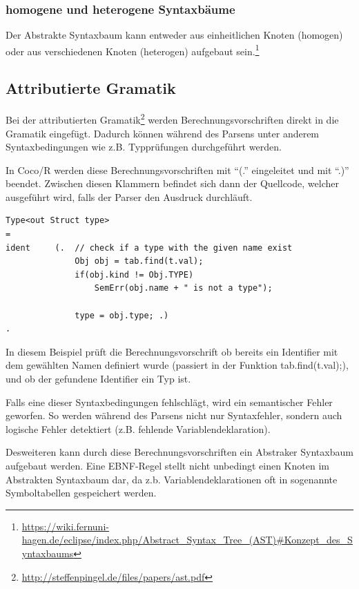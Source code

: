 \subsubsection{homogene und heterogene Syntaxbäume}

Der Abstrakte Syntaxbaum kann entweder aus einheitlichen Knoten (homogen) oder aus verschiedenen Knoten (heterogen) aufgebaut sein.\footnote{\url{https://wiki.fernuni-hagen.de/eclipse/index.php/Abstract_Syntax_Tree_(AST)\#Konzept_des_Syntaxbaums}}

\subsection{Attributierte Gramatik}

Bei der attributierten Gramatik\footnote{\url{http://steffenpingel.de/files/papers/ast.pdf}} werden Berechnungsvorschriften direkt in die Gramatik eingef\"ugt. Dadurch k\"onnen w\"ahrend des Parsens unter anderem Syntaxbedingungen wie z.B. Typpr\"ufungen durchgef\"uhrt werden.

In Coco/R werden diese Berechnungsvorschriften mit ``(.'' eingeleitet und mit ``.)'' beendet. Zwischen diesen Klammern befindet sich dann der Quellcode, welcher ausgef\"uhrt wird, falls der Parser den Ausdruck durchl\"auft.


\begin{lstlisting}[language=EBNF]
Type<out Struct type>
= 
ident     (.  // check if a type with the given name exist
              Obj obj = tab.find(t.val);
              if(obj.kind != Obj.TYPE)
                  SemErr(obj.name + " is not a type");

              type = obj.type; .)
. 
\end{lstlisting}

In diesem Beispiel pr\"uft die Berechnungsvorschrift ob bereits ein Identifier mit dem gew\"ahlten Namen definiert wurde (passiert in der Funktion tab.find(t.val);), und ob der gefundene Identifier ein Typ ist. 

Falls eine dieser Syntaxbedingungen fehlschl\"agt, wird ein semantischer Fehler geworfen. So werden w\"ahrend des Parsens nicht nur Syntaxfehler, sondern auch logische Fehler detektiert (z.B. fehlende Variablendeklaration).

Desweiteren kann durch diese Berechnungsvorschriften ein Abstraker Syntaxbaum aufgebaut werden. Eine EBNF-Regel stellt nicht unbedingt einen Knoten im Abstrakten Syntaxbaum dar, da z.b. Variablendeklarationen oft in sogenannte Symboltabellen gespeichert werden.

